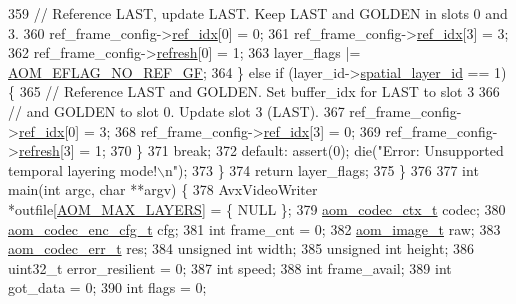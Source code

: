 \begin{DoxyCodeInclude}
{{{{{{{{{359         \textcolor{comment}{// Reference LAST, update LAST. Keep LAST and GOLDEN in slots 0 and 3.}
360         ref\_frame\_config->\hyperlink{structaom__svc__ref__frame__config_ae6f0dece96f18986127eb6c2ee66c210}{ref\_idx}[0] = 0;
361         ref\_frame\_config->\hyperlink{structaom__svc__ref__frame__config_ae6f0dece96f18986127eb6c2ee66c210}{ref\_idx}[3] = 3;
362         ref\_frame\_config->\hyperlink{structaom__svc__ref__frame__config_ab2a4596eadeaf5b7730588367918beda}{refresh}[0] = 1;
363         layer\_flags |= \hyperlink{group__aom__encoder_gaaef6fe76991abf87edd2f296eee999f8}{AOM\_EFLAG\_NO\_REF\_GF};
364       \} \textcolor{keywordflow}{else} \textcolor{keywordflow}{if} (layer\_id->\hyperlink{structaom__svc__layer__id_af018f2e9cc472827a75b92a78ba6ee4e}{spatial\_layer\_id} == 1) \{
365         \textcolor{comment}{// Reference LAST and GOLDEN. Set buffer\_idx for LAST to slot 3}
366         \textcolor{comment}{// and GOLDEN to slot 0. Update slot 3 (LAST).}
367         ref\_frame\_config->\hyperlink{structaom__svc__ref__frame__config_ae6f0dece96f18986127eb6c2ee66c210}{ref\_idx}[0] = 3;
368         ref\_frame\_config->\hyperlink{structaom__svc__ref__frame__config_ae6f0dece96f18986127eb6c2ee66c210}{ref\_idx}[3] = 0;
369         ref\_frame\_config->\hyperlink{structaom__svc__ref__frame__config_ab2a4596eadeaf5b7730588367918beda}{refresh}[3] = 1;
370       \}
371       \textcolor{keywordflow}{break};
372     \textcolor{keywordflow}{default}: assert(0); die(\textcolor{stringliteral}{"Error: Unsupported temporal layering mode!\(\backslash\)n"});
373   \}
374   \textcolor{keywordflow}{return} layer\_flags;
375 \}
376 
377 \textcolor{keywordtype}{int} main(\textcolor{keywordtype}{int} argc, \textcolor{keywordtype}{char} **argv) \{
378   AvxVideoWriter *outfile[\hyperlink{group__aom__encoder_ga3589babe0100b5bf7dc7167675014608}{AOM\_MAX\_LAYERS}] = \{ NULL \};
379   \hyperlink{structaom__codec__ctx}{aom\_codec\_ctx\_t} codec;
380   \hyperlink{structaom__codec__enc__cfg}{aom\_codec\_enc\_cfg\_t} cfg;
381   \textcolor{keywordtype}{int} frame\_cnt = 0;
382   \hyperlink{structaom__image}{aom\_image\_t} raw;
383   \hyperlink{group__codec_gaaae61e0f8663e6137f1e228757248e7c}{aom\_codec\_err\_t} res;
384   \textcolor{keywordtype}{unsigned} \textcolor{keywordtype}{int} width;
385   \textcolor{keywordtype}{unsigned} \textcolor{keywordtype}{int} height;
386   uint32\_t error\_resilient = 0;
387   \textcolor{keywordtype}{int} speed;
388   \textcolor{keywordtype}{int} frame\_avail;
389   \textcolor{keywordtype}{int} got\_data = 0;
390   \textcolor{keywordtype}{int} flags = 0;
}}}}}}}}}
\end{DoxyCodeInclude}
